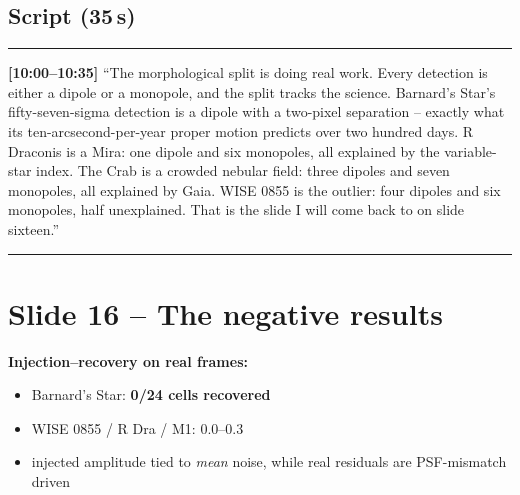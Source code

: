 \documentclass[11pt,a4paper]{article}
\begin{document}
\begin{center}
\end{center}

\subsection*{Script (35\,s)}
\noindent\rule{\linewidth}{0.3pt}\par\smallskip\noindent
\textbf{[10:00--10:35]} ``The morphological split is doing real work. Every detection is either a dipole
or a monopole, and the split tracks the science. Barnard's Star's fifty-seven-sigma detection is a
dipole with a two-pixel separation -- exactly what its ten-arcsecond-per-year proper motion predicts
over two hundred days. R Draconis is a Mira: one dipole and six monopoles, all explained by the
variable-star index. The Crab is a crowded nebular field: three dipoles and seven monopoles, all
explained by Gaia. WISE 0855 is the outlier: four dipoles and six monopoles, half unexplained. That is
the slide I will come back to on slide sixteen.''
\par\smallskip\noindent\rule{\linewidth}{0.3pt}

\section{Slide 16 -- The negative results}

\textbf{Injection--recovery on real frames:}
\begin{itemize}[leftmargin=1em,itemsep=1pt]
\item Barnard's Star: \textbf{0/24 cells recovered}
\item WISE 0855 / R Dra / M1: 0.0--0.3
\item injected amplitude tied to \emph{mean} noise, while real residuals are PSF-mismatch driven
\end{itemize}
\end{document}
